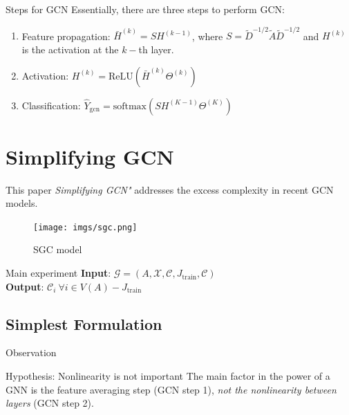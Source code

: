 \documentclass{beamer}
\begin{document}
    \begin{frame}{Steps for GCN}
        Essentially, there are three steps to perform GCN:
        \pause
        \begin{enumerate}
            \item Feature propagation: $\bar{H}^{(k)} = SH^{(k-1)}$, where $S = \tilde{D}^{-1/2} \tilde{A} \tilde{D}^{-1/2}$ and $H^{(k)}$ is the activation at the $k-$th layer.
            \pause
            \item Activation: $H^{(k)} = \text{ReLU}(\bar{H}^{(k)}\Theta^{(k)})$
            \pause
            \item Classification: $\hat{Y}_\text{gcn} = \text{softmax}(SH^{(K-1)}\Theta^{(K)})$
        \end{enumerate}
    \end{frame}

    \section{Simplifying GCN}

    \begin{frame}{This paper}
        \emph{Simplifying GCN"} addresses the excess complexity in recent GCN models.
        \begin{figure}
            \centering
            \texttt{[image: imgs/sgc.png]}
            \caption{SGC model}
            \label{fig:sgc}
        \end{figure}
        \pause
        \begin{block}{Main experiment}
            \textbf{Input}: $\mathcal{G} = (A, \mathcal{X}, \mathcal{C}, J_{\text{train}}, \mathcal{C})$ \\
            \textbf{Output}: $\mathcal{C}_i \ \forall i \in V(A) - J_{\text{train}}$
        \end{block}
    \end{frame}

    \subsection{Simplest Formulation}

    \begin{frame}{Observation}
       \begin{block}{Hypothesis: Nonlinearity is not important}
            \textcolor{example}{The main} factor in the power of a GNN is the
            feature averaging step (GCN step 1), \emph{not the nonlinearity between layers} (GCN step 2).
       \end{block} 
    \end{frame}
\end{document}
